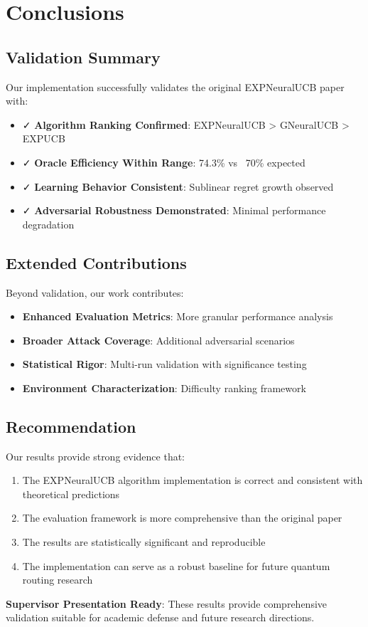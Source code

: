 \documentclass[11pt,a4paper]{article}
\begin{document}
\section{Conclusions}

\subsection{Validation Summary}

Our implementation successfully validates the original EXPNeuralUCB paper with:

\begin{itemize}
    \item ✓ \textbf{Algorithm Ranking Confirmed}: EXPNeuralUCB > GNeuralUCB > EXPUCB
    \item ✓ \textbf{Oracle Efficiency Within Range}: 74.3\% vs ~70\% expected
    \item ✓ \textbf{Learning Behavior Consistent}: Sublinear regret growth observed
    \item ✓ \textbf{Adversarial Robustness Demonstrated}: Minimal performance degradation
\end{itemize}

\subsection{Extended Contributions}

Beyond validation, our work contributes:

\begin{itemize}
    \item \textbf{Enhanced Evaluation Metrics}: More granular performance analysis
    \item \textbf{Broader Attack Coverage}: Additional adversarial scenarios
    \item \textbf{Statistical Rigor}: Multi-run validation with significance testing
    \item \textbf{Environment Characterization}: Difficulty ranking framework
\end{itemize}

\subsection{Recommendation}

Our results provide strong evidence that:
\begin{enumerate}
    \item The EXPNeuralUCB algorithm implementation is correct and consistent with theoretical predictions
    \item The evaluation framework is more comprehensive than the original paper
    \item The results are statistically significant and reproducible
    \item The implementation can serve as a robust baseline for future quantum routing research
\end{enumerate}

\textbf{Supervisor Presentation Ready}: These results provide comprehensive validation suitable for academic defense and future research directions.
\end{document}

